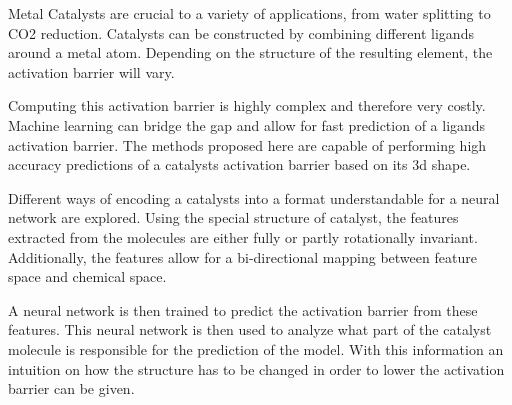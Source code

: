 
\Abstract

Metal Catalysts are crucial to a variety of applications, from water splitting to CO2 reduction.
Catalysts can be constructed by combining different ligands around a metal atom.
Depending on the structure of the resulting element, the activation barrier will vary.

Computing this activation barrier is highly complex and therefore very costly. 
Machine learning can bridge the gap and allow for fast prediction of a ligands activation barrier.
The methods proposed here are capable of performing high accuracy predictions of a catalysts activation barrier based on
its 3d shape.

Different ways of encoding a catalysts into a format understandable for a neural network are explored.
Using the special structure of catalyst, the features extracted from the molecules are either fully or partly rotationally invariant.
Additionally, the features allow for a bi-directional mapping between feature space and chemical space.

A neural network is then trained to predict the activation barrier from these features.
This neural network is then used to analyze what part of the catalyst molecule is responsible for the prediction of the model.
With this information an intuition on how the structure has to be changed in order to lower the activation barrier can be given.